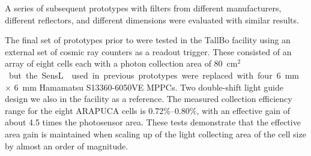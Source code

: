 

A series of subsequent prototypes with filters from different manufacturers, different reflectors, and different dimensions were evaluated with similar results. 

The final set of prototypes prior to  were tested in the TallBo facility using an external set of cosmic ray counters as a readout trigger. These consisted of an array of eight  cells each with a photon collection area of \SI{80}{cm$^2$} but the SensL  used in previous prototypes were replaced with four \SI{6}{mm} $\times$ \SI{6}{mm} Hamamatsu S13360-6050VE MPPCs. Two double-shift light guide design we also in the facility as a reference.
The measured collection efficiency range for the eight ARAPUCA cells is 0.72\%--0.80\%, with an effective  gain of about 4.5 times the photosensor area. These tests demonstrate that the effective area gain is maintained when scaling up of the light collecting area of the cell size by almost an order of magnitude.



